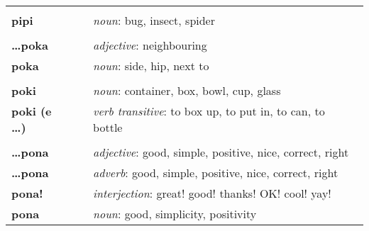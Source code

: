 \begin{supertabular}{p{2,5cm}|ll}
                                 &  &                                                                                                            \\ %
    \textbf{pipi}                &  & \textit{noun}: bug, insect, spider                                                                         \\
                                 &  &                                                                                                            \\ %
    \textbf{\dots poka}          &  & \textit{adjective}: neighbouring                                                                           \\
    \textbf{poka}                &  & \textit{noun}: side, hip, next to                                                                          \\
                                 &  &                                                                                                            \\ %
    \textbf{poki}                &  & \textit{noun}: container, box, bowl, cup, glass                                                            \\
    \textbf{poki (e \dots)}      &  & \textit{verb transitive}: to box up, to put in, to can, to bottle                                          \\
                                 &  &                                                                                                            \\ %
    \textbf{\dots pona}          &  & \textit{adjective}: good, simple, positive, nice, correct, right                                           \\
    \textbf{\dots pona}          &  & \textit{adverb}: good, simple, positive, nice, correct, right                                              \\
    \textbf{pona!}               &  & \textit{interjection}: great! good! thanks! OK! cool! yay!                                                 \\
    \textbf{pona}                &  & \textit{noun}: good, simplicity, positivity                                                                \\

\end{supertabular}
